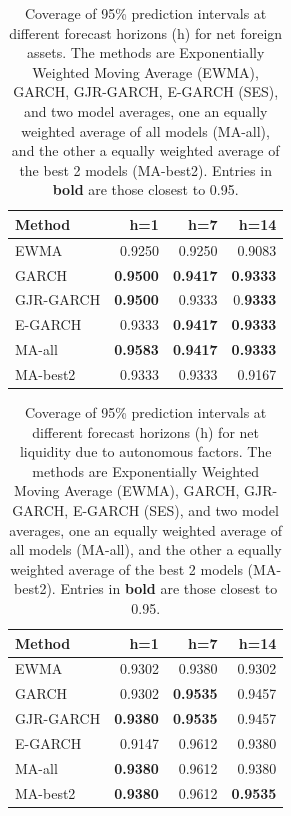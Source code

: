 \documentclass{article}
\begin{document}
\begin{table}[!ht]
\centering
\begin{tabular}{lrrr}
  \hline
Method & h=1 & h=7 & h=14 \\ 
  \hline
EWMA & 0.9250 & 0.9250 & 0.9083 \\ 
  GARCH & \textbf{0.9500} & \textbf{0.9417} & \textbf{0.9333} \\ 
  GJR-GARCH & \textbf{0.9500} & 0.9333 & 0.\textbf{9333} \\ 
  E-GARCH & 0.9333 & \textbf{0.9417} & \textbf{0.9333} \\ 
  MA-all & \textbf{0.9583} & \textbf{0.9417} & \textbf{0.9333} \\ 
  MA-best2 & 0.9333 & 0.9333 & 0.9167 \\ 
   \hline
\end{tabular}
\caption{Coverage of 95\% prediction intervals at different forecast horizons (h) for net foreign assets. The methods are Exponentially Weighted Moving Average (EWMA), GARCH, GJR-GARCH, E-GARCH (SES), and two model averages, one an equally weighted average of all models (MA-all), and the other a equally weighted average of the best 2 models (MA-best2). Entries in \textbf{bold} are those closest to 0.95.} \label{tab:nfasum}
\end{table}

\begin{table}[!ht]
\centering
\begin{tabular}{lrrr}
  \hline
Method & h=1 & h=7 & h=14 \\ 
  \hline
EWMA & 0.9302 & 0.9380 & 0.9302 \\ 
  GARCH & 0.9302 & \textbf{0.9535} & 0.9457 \\ 
  GJR-GARCH & \textbf{0.9380 }& \textbf{0.9535} & 0.9457 \\ 
  E-GARCH & 0.9147 & 0.9612 & 0.9380 \\ 
  MA-all &\textbf{ 0.9380} & 0.9612 & 0.9380 \\ 
  MA-best2 & \textbf{0.9380} & 0.9612 & \textbf{0.9535} \\ 
   \hline
\end{tabular}
\caption{Coverage of 95\% prediction intervals at different forecast horizons (h) for net liquidity due to autonomous factors. The methods are Exponentially Weighted Moving Average (EWMA), GARCH, GJR-GARCH, E-GARCH (SES), and two model averages, one an equally weighted average of all models (MA-all), and the other a equally weighted average of the best 2 models (MA-best2). Entries in \textbf{bold} are those closest to 0.95.} \label{tab:aggsum}
\end{table}
\end{document}
